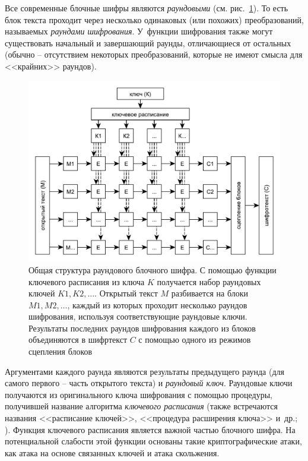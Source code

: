 Все современные блочные шифры являются \emph{раундовыми} (см. рис.~\ref{fig:block-cipher}). То есть блок текста проходит через несколько одинаковых (или похожих) преобразований, называемых \emph{раундами шифрования}. У~функции шифрования также могут существовать начальный и завершающий раунды, отличающиеся от остальных (обычно -- отсутствием некоторых преобразований, которые не имеют смысла для <<крайних>> раундов).

\begin{figure}[!t]
	\centering
	\includegraphics[width=1\textwidth]{pic/block-cipher}
  \caption{Общая структура раундового блочного шифра. С помощью функции ключевого расписания из ключа $K$ получается набор раундовых ключей $K1, K2, \dots$. Открытый текст $M$ разбивается на блоки $M1, M2, \dots$, каждый из которых проходит несколько раундов шифрования, используя соответствующие раундовые ключи. Результаты последних раундов шифрования каждого из блоков объединяются в шифртекст $C$ с помощью одного из режимов сцепления блоков}
  \label{fig:block-cipher}
\end{figure}

Аргументами каждого раунда являются результаты предыдущего раунда (для самого первого -- часть открытого текста) и \emph{раундовый ключ}. Раундовые ключи получаются из оригинального ключа шифрования с помощью процедуры, получившей название алгоритма \emph{ключевого расписания} (также встречаются названия <<расписание ключей>>, <<процедура расширения ключа>> и~др.; ). Функция ключевого расписания является важной частью блочного шифра. На потенциальной слабости этой функции основаны такие криптографические атаки, как атака на основе связанных ключей и атака скольжения.

